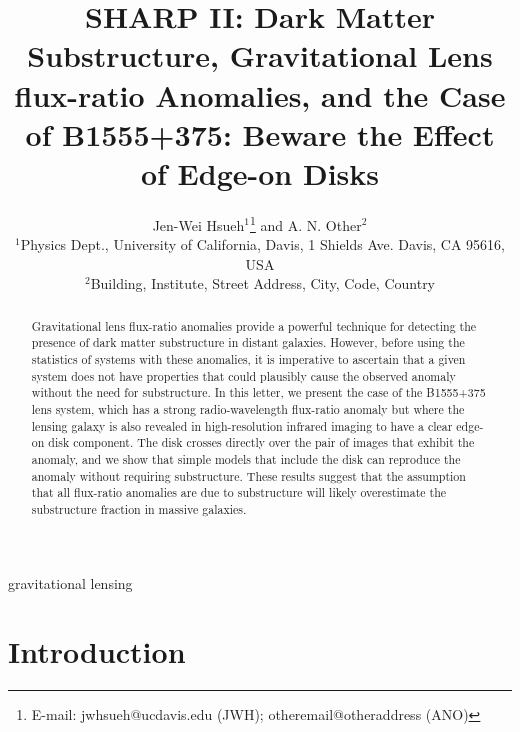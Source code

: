 \documentclass[useAMS,usenatbib]{mnras}
\title[Beware the Effect of Edge-on Disks]{
SHARP II: Dark Matter Substructure, Gravitational Lens flux-ratio
Anomalies, and the Case of B1555+375: Beware the Effect of Edge-on
Disks
}
\author[Hsueh et al.]{Jen-Wei Hsueh$^{1}$\thanks{E-mail:
jwhsueh@ucdavis.edu (JWH); otheremail@otheraddress (ANO)} and A. N.
Other$^{2}$\\
$^{1}$Physics Dept., University of California, Davis, 1 Shields Ave.
Davis, CA 95616, USA\\
$^{2}$Building, Institute, Street Address, City, Code, Country}
\begin{document}

\pagerange{\pageref{firstpage}--\pageref{lastpage}} 

\maketitle

\label{firstpage}

\begin{abstract}

Gravitational lens flux-ratio anomalies provide a powerful technique
for detecting the presence of dark matter substructure in distant
galaxies.  However, before using the statistics of systems with these
anomalies, it is imperative to ascertain that a given system does not
have properties that could plausibly cause the observed anomaly
without the need for substructure.  In this letter, we present the
case of the B1555+375 lens system, which has a strong radio-wavelength
flux-ratio anomaly but where the lensing galaxy is also revealed in
high-resolution infrared imaging to have a clear edge-on disk component.  The
disk crosses directly over the pair of images that exhibit the
anomaly, and we show that simple models that include the disk can
reproduce the anomaly without requiring substructure.  
These results suggest that the assumption that
all flux-ratio anomalies are due to substructure will likely overestimate
the substructure fraction in massive galaxies.

\end{abstract}

\begin{keywords}
gravitational lensing
\end{keywords}

\section{Introduction}
\end{document}
